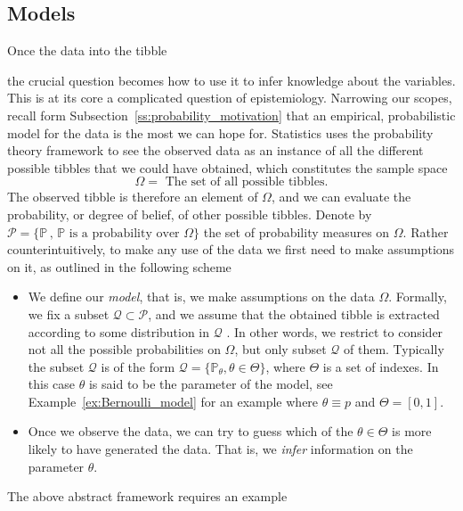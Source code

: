 \subsection{Models}
	\label{ss:models}
	Once the data into the tibble
\begin{knitrout}
\color{fgcolor}\begin{kframe}
\begin{alltt}
\end{alltt}


{\ttfamily\noindent\bfseries\color{errorcolor}{\#\# Error in head(Experiment\_result): oggetto 'Experiment\_result' non trovato}}\end{kframe}
\end{knitrout}
	the crucial question becomes how to use it to infer knowledge about the variables. This is at its core a complicated question of epistemiology. Narrowing our scopes, recall form Subsection~\ref{ss:probability_motivation} that an empirical, probabilistic model for the data is the most we can hope for. Statistics uses the probability theory framework to see the observed data as an instance of all the different possible tibbles that we could have obtained, which constitutes the sample space
	\begin{equation}
		\Omega = \text{ The set of all possible tibbles}.
	\end{equation}
	The observed tibble is therefore an element of $\Omega$, and we can evaluate the probability, or degree of belief, of other possible tibbles. Denote by $\mathcal P= \{\mathbb P \,,\, \mathbb P \text{ is a probability over $\Omega$} \}$ the set of probability measures on $\Omega$. Rather counterintuitively, to make any use of the data we first need to make assumptions on it, as outlined in the following scheme
	\begin{itemize}
		\item We define our \emph{model}, that is, we make assumptions on the data $\Omega$. Formally, we fix a subset $ \mathcal Q \subset \mathcal P$, and we assume that the obtained tibble is extracted according to some distribution in $\mathcal Q$ . In other words, we restrict to consider not all the possible probabilities on $\Omega$, but only subset $\mathcal Q$ of them. Typically the subset $\mathcal Q$ is of the form $\mathcal Q = \{ \mathbb P_\theta, \theta \in \Theta\}$, where $\Theta$ is a set of indexes. In this case $\theta$ is said to be the parameter of the model, see Example~\ref{ex:Bernoulli_model} for an example where $\theta \equiv p$ and  $\Theta = [0,1]$. 
		\item 	Once we observe the data, we can try to guess which of the $\theta \in \Theta$ is more likely to have generated the data. That is, we \emph{infer} information on the parameter $\theta$. 
 \end{itemize}
	The above abstract framework requires an example

